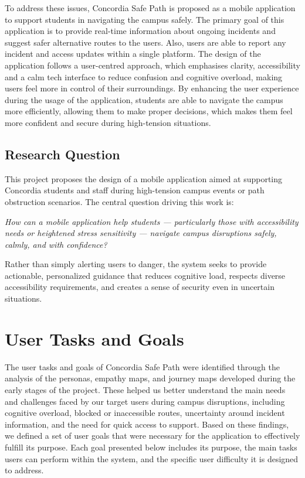 \documentclass[sigconf]{acmart}
\begin{document}
To address these issues, Concordia Safe Path is proposed as a mobile application to support students in navigating the campus safely. The primary goal of this application is to provide real-time information about ongoing incidents and suggest safer alternative routes to the users. Also, users are able to report any incident and access updates within a single platform. The design of the application follows a user-centred approach, which emphasises clarity, accessibility and a calm tech interface to reduce confusion and cognitive overload, making users feel more in control of their surroundings. By enhancing the user experience during the usage of the application, students are able to navigate the campus more efficiently, allowing them to make proper decisions, which makes them feel more confident and secure during high-tension situations.

\subsection{Research Question}
This project proposes the design of a mobile application aimed at supporting Concordia students and staff during high-tension campus events or path obstruction scenarios. The central question driving this work is:

\begin{mdframed}[linewidth=1pt, linecolor=black, leftmargin=10pt, rightmargin=10pt, innerleftmargin=12pt, innerrightmargin=12pt, innertopmargin=10pt, innerbottommargin=10pt, skipabove=12pt]
    \textit{How can a mobile application help students — particularly those with accessibility needs or heightened stress sensitivity — navigate campus disruptions safely, calmly, and with confidence?}
\end{mdframed}
\vspace{12pt}

Rather than simply alerting users to danger, the system seeks to provide actionable, personalized guidance that reduces cognitive load, respects diverse accessibility requirements, and creates a sense of security even in uncertain situations.

\section{User Tasks and Goals}
\label{sec:goals}
 
The user tasks and goals of Concordia Safe Path were identified through the analysis of the personas, empathy maps, and journey maps developed during the early stages of the project. These helped us better understand the main needs and challenges faced by our target users during campus disruptions, including cognitive overload, blocked or inaccessible routes, uncertainty around incident information, and the need for quick access to support. Based on these findings, we defined a set of user goals that were necessary for the application to effectively fulfill its purpose. Each goal presented below includes its purpose, the main tasks users can perform within the system, and the specific user difficulty it is designed to address.
 
\end{document}

